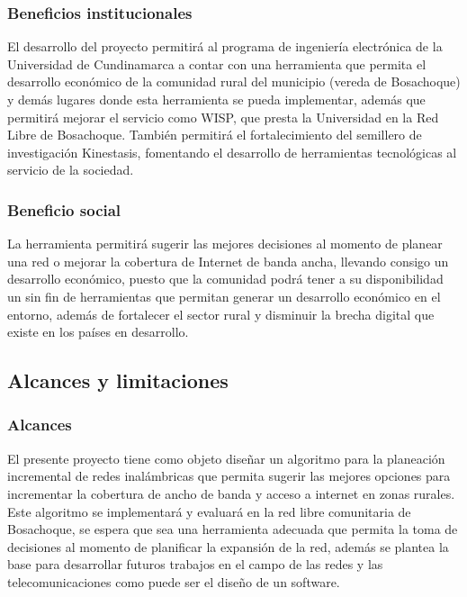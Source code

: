 \documentclass[]{article}
\begin{document}
\subsubsection{Beneficios
institucionales}\label{beneficios-institucionales}

El desarrollo del proyecto permitirá al programa de ingeniería
electrónica de la Universidad de Cundinamarca a contar con una
herramienta que permita el desarrollo económico de la comunidad rural
del municipio (vereda de Bosachoque) y demás lugares donde esta
herramienta se pueda implementar, además que permitirá mejorar el
servicio como WISP, que presta la Universidad en la Red Libre de
Bosachoque. También permitirá el fortalecimiento del semillero de
investigación Kinestasis, fomentando el desarrollo de herramientas
tecnológicas al servicio de la sociedad.

\subsubsection{Beneficio social}\label{beneficio-social}

La herramienta permitirá sugerir las mejores decisiones al momento de
planear una red o mejorar la cobertura de Internet de banda ancha,
llevando consigo un desarrollo económico, puesto que la comunidad podrá
tener a su disponibilidad un sin fin de herramientas que permitan
generar un desarrollo económico en el entorno, además de fortalecer el
sector rural y disminuir la brecha digital que existe en los países en
desarrollo.

\subsection{Alcances y limitaciones}\label{alcances-y-limitaciones}

\subsubsection{Alcances}\label{alcances}

El presente proyecto tiene como objeto diseñar un algoritmo para la
planeación incremental de redes inalámbricas que permita sugerir las
mejores opciones para incrementar la cobertura de ancho de banda y
acceso a internet en zonas rurales. Este algoritmo se implementará y
evaluará en la red libre comunitaria de Bosachoque, se espera que sea
una herramienta adecuada que permita la toma de decisiones al momento de
planificar la expansión de la red, además se plantea la base para
desarrollar futuros trabajos en el campo de las redes y las
telecomunicaciones como puede ser el diseño de un software.
\end{document}
